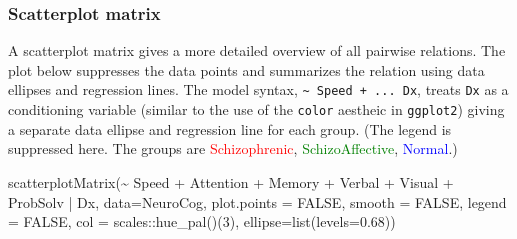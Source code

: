 \documentclass[
  letterpaper,
  10pt,
  krantz2]{krantz}
\makeatletter
\newenvironment{Shaded}{\begin{snugshade}}{\end{snugshade}}
\newcommand{\AttributeTok}[1]{\textcolor[rgb]{0.40,0.45,0.13}{#1}}
\newcommand{\ConstantTok}[1]{\textcolor[rgb]{0.56,0.35,0.01}{#1}}
\newcommand{\DecValTok}[1]{\textcolor[rgb]{0.68,0.00,0.00}{#1}}
\newcommand{\FloatTok}[1]{\textcolor[rgb]{0.68,0.00,0.00}{#1}}
\newcommand{\FunctionTok}[1]{\textcolor[rgb]{0.28,0.35,0.67}{#1}}
\newcommand{\NormalTok}[1]{\textcolor[rgb]{0.00,0.23,0.31}{#1}}
\newcommand{\SpecialCharTok}[1]{\textcolor[rgb]{0.37,0.37,0.37}{#1}}
\newenvironment{kframe}{%
  \medskip{}
  \setlength{\fboxsep}{.8em}
  \def\at@end@of@kframe{}%
  \ifinner\ifhmode%
  \def\at@end@of@kframe{\end{minipage}}%
  \begin{minipage}{\columnwidth}%
  \fi\fi%
  \def\FrameCommand##1{\hskip\@totalleftmargin \hskip-\fboxsep
  \colorbox{shadecolor}{##1}\hskip-\fboxsep
      \hskip-\linewidth \hskip-\@totalleftmargin \hskip\columnwidth}%
  \MakeFramed {\advance\hsize-\width
    \@totalleftmargin\z@ \linewidth\hsize
    \@setminipage}}%
{\par\unskip\endMakeFramed%
  \at@end@of@kframe}
\renewenvironment{Shaded}{\begin{kframe}}{\end{kframe}}
\makeatother
\begin{document}
\hypertarget{scatterplot-matrix}{%
\subsubsection*{Scatterplot matrix}\label{scatterplot-matrix}}

A scatterplot matrix gives a more detailed overview of all pairwise
relations. The plot below suppresses the data points and summarizes the
relation using data ellipses and regression lines. The model syntax,
\texttt{\textasciitilde{}\ Speed\ +\ ...\ \textbar{}Dx}, treats
\texttt{Dx} as a conditioning variable (similar to the use of the
\texttt{color} aestheic in \texttt{ggplot2}) giving a separate data
ellipse and regression line for each group. (The legend is suppressed
here. The groups are \textcolor{red}{Schizophrenic},
\textcolor{green}{SchizoAffective}, \textcolor{blue}{Normal}.)

\begin{Shaded}
\begin{Highlighting}[]
\FunctionTok{scatterplotMatrix}\NormalTok{(}\SpecialCharTok{\textasciitilde{}}\NormalTok{ Speed }\SpecialCharTok{+}\NormalTok{ Attention }\SpecialCharTok{+}\NormalTok{ Memory }\SpecialCharTok{+}\NormalTok{ Verbal }\SpecialCharTok{+}\NormalTok{ Visual }\SpecialCharTok{+}\NormalTok{ ProbSolv }\SpecialCharTok{|}\NormalTok{ Dx,}
  \AttributeTok{data=}\NormalTok{NeuroCog,}
  \AttributeTok{plot.points =} \ConstantTok{FALSE}\NormalTok{,}
  \AttributeTok{smooth =} \ConstantTok{FALSE}\NormalTok{,}
  \AttributeTok{legend =} \ConstantTok{FALSE}\NormalTok{,}
  \AttributeTok{col =}\NormalTok{ scales}\SpecialCharTok{::}\FunctionTok{hue\_pal}\NormalTok{()(}\DecValTok{3}\NormalTok{),}
  \AttributeTok{ellipse=}\FunctionTok{list}\NormalTok{(}\AttributeTok{levels=}\FloatTok{0.68}\NormalTok{))}
\end{Highlighting}
\end{Shaded}
\end{document}

